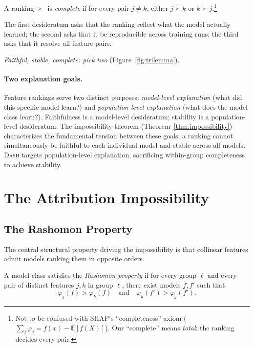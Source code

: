 \documentclass{jmlr}
\newcommand{\E}{\mathbb{E}}
\newcommand{\DASH}{\textsc{Dash}}
\begin{document}
\begin{definition}[Complete]
\label{def:complete}
A ranking $\succ$ is \emph{complete} if for every pair $j \neq k$, either $j \succ k$ or $k \succ j$.\footnote{Not to be confused with SHAP's ``completeness'' axiom ($\sum_j \varphi_j = f(x) - \E[f(X)]$). Our ``complete'' means \emph{total}: the ranking decides every pair.}
\end{definition}

The first desideratum asks that the ranking reflect what the model actually learned; the second asks that it be reproducible across training runs; the third asks that it resolve all feature pairs.

\emph{Faithful, stable, complete: pick two} (Figure~\ref{fig:trilemma}).

\paragraph{Two explanation goals.}
Feature rankings serve two distinct purposes: \emph{model-level explanation} (what did this specific model learn?) and \emph{population-level explanation} (what does the model class learn?).
Faithfulness is a model-level desideratum; stability is a population-level desideratum.
The impossibility theorem (Theorem~\ref{thm:impossibility}) characterizes the fundamental tension between these goals: a ranking cannot simultaneously be faithful to each individual model and stable across all models.
\DASH{} targets population-level explanation, sacrificing within-group completeness to achieve stability.


\section{The Attribution Impossibility}
\label{sec:impossibility}

\subsection{The Rashomon Property}
\label{sec:rashomon}

The central structural property driving the impossibility is that collinear features admit models ranking them in opposite orders.

\begin{definition}
\label{def:rashomon}
A model class satisfies the \emph{Rashomon property} if for every group $\ell$ and every pair of distinct features $j, k$ in group $\ell$, there exist models $f, f'$ such that
\[
    \varphi_j(f) > \varphi_k(f) \quad \text{and} \quad \varphi_k(f') > \varphi_j(f').
\]
\end{definition}
\end{document}
